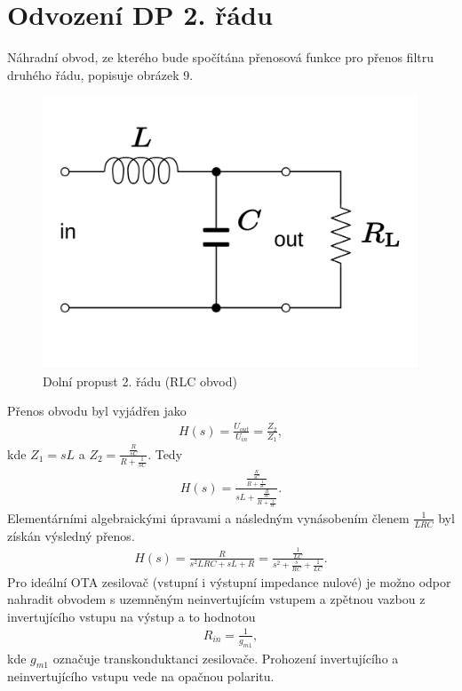 \documentclass[twoside]{article}
\begin{document}
\section{Odvození DP 2. řádu}
Náhradní obvod, ze kterého bude spočítána přenosová funkce pro přenos filtru druhého řádu, popisuje obrázek 9.
\begin{figure}[H]
\centering
\includegraphics[scale=0.15]{RLC_low-pass.png}
\caption{Dolní propust 2. řádu (RLC obvod) \cite{7}}
\end{figure}
\noindent Přenos obvodu byl vyjádřen jako
\begin{align}
H(s) = \frac{U_{out}}{U_{in}} = \frac{Z_2}{Z_1},
\end{align}
kde $Z_1 = sL$ a $Z_2 = \frac{\frac{R}{sC}}{R + \frac{1}{sC}}$. Tedy
\begin{align}
H(s) = \frac{\frac{\frac{R}{sC}}{R + \frac{1}{sC}}}{sL + \frac{\frac{R}{sC}}{R + \frac{1}{sC}}}.
\end{align}
Elementárními algebraickými úpravami a následným vynásobením členem $\frac{1}{LRC}$ byl získán výsledný přenos.
\begin{align}
H(s) = \frac{R}{s^2LRC + sL + R} = \frac{\frac{1}{LC}}{s^2 + \frac{s}{RC} + \frac{1}{LC}}.
\end{align}
\noindent Pro ideální OTA zesilovač (vstupní i výstupní impedance nulové) je možno odpor nahradit obvodem s uzemněným neinvertujícím vstupem a zpětnou vazbou z invertujícího vstupu na výstup a to hodnotou
\begin{align}
R_{in} = \frac{1}{g_{m1}},
\end{align}
kde $g_{m1}$ označuje transkonduktanci zesilovače. Prohození invertujícího a neinvertujícího vstupu vede na opačnou polaritu.
\end{document}
